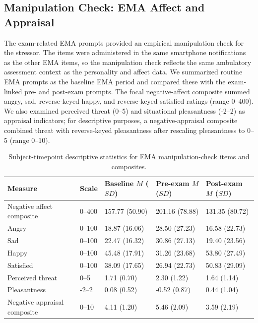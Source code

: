 \documentclass[
  english,
  man,floatsintext]{apa6}
\begin{document}
\subsection{Manipulation Check: EMA Affect and Appraisal}\label{s-mc}

The exam-related EMA prompts provided an empirical manipulation check for the stressor. The items were administered in the same smartphone notifications as the other EMA items, so the manipulation check reflects the same ambulatory assessment context as the personality and affect data. We summarized routine EMA prompts as the baseline EMA period and compared these with the exam-linked pre- and post-exam prompts. The focal negative-affect composite summed angry, sad, reverse-keyed happy, and reverse-keyed satisfied ratings (range 0--400). We also examined perceived threat (0--5) and situational pleasantness (-2--2) as appraisal indicators; for descriptive purposes, a negative-appraisal composite combined threat with reverse-keyed pleasantness after rescaling pleasantness to 0--5 (range 0--10).

\begin{table}

\caption{\label{tab:table-s-mc-descriptives}Subject-timepoint descriptive statistics for EMA manipulation-check items and composites.}
\centering
\begin{tabular}[t]{lllll}
\toprule
Measure & Scale & Baseline $M$ ($SD$) & Pre-exam $M$ ($SD$) & Post-exam $M$ ($SD$)\\
\midrule
Negative affect composite & 0--400 & 157.77 (50.90) & 201.16 (78.88) & 131.35 (80.72)\\
Angry & 0--100 & 18.87 (16.06) & 28.50 (27.23) & 16.58 (22.73)\\
Sad & 0--100 & 22.47 (16.32) & 30.86 (27.13) & 19.40 (23.56)\\
Happy & 0--100 & 45.48 (17.91) & 31.26 (23.68) & 53.80 (27.49)\\
Satisfied & 0--100 & 38.09 (17.65) & 26.94 (22.73) & 50.83 (29.09)\\
\addlinespace
Perceived threat & 0--5 & 1.71 (0.70) & 2.30 (1.22) & 1.64 (1.14)\\
Pleasantness & -2--2 & 0.08 (0.52) & -0.52 (0.87) & 0.44 (1.04)\\
Negative appraisal composite & 0--10 & 4.11 (1.20) & 5.46 (2.09) & 3.59 (2.19)\\
\bottomrule
\end{tabular}
\end{table}
\end{document}
